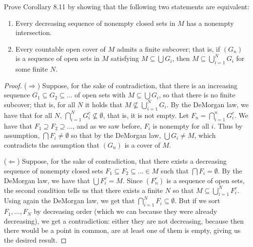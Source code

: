 \begin{exercise}{32}
Prove Corollary 8.11 by showing that the following two statements are equivalent:
\begin{enumerate}
    \item Every decreasing sequence of nonempty closed sets in $M$ has a nonempty intersection.
    \item Every countable open cover of $M$ admits a finite subcover;
    that is, if $(G_n)$ is a sequence of open sets in $M$ satisfying $M \subseteq \bigcup G_i$, then $M\subseteq \bigcup_{i=1}^N G_i$ for some finite $N$.
\end{enumerate}
\end{exercise}
\begin{proof}
($\Rightarrow$)
Suppose, for the sake of contradiction, that there is an increasing sequence $G_1 \subseteq G_2 \subseteq \dots$ of open sets with $M\subseteq\bigcup G_i$, so that there is no finite subcover;
that is, for all $N$ it holds that $M\not\subseteq \bigcup_{i=1}^N G_i$.
By the DeMorgan law, we have that for all $N$, $\bigcap_{i=1}^N G_i^c \not\subseteq \emptyset$, that is, it is not empty.
Let $F_n = \bigcap_{i=1}^n G_i^c$.
We have that $F_1 \supseteq F_2 \supseteq \dots$, and as we saw before, $F_i$ is nonempty for all $i$.
Thus by assumption, $\bigcap F_i \neq \emptyset$ so that by the DeMorgan law, $\bigcup G_i \neq M$, which contradicts the assumption that $(G_n)$ is a cover of $M$.

($\Leftarrow$)
Suppose, for the sake of contradiction, that there exists a decreasing sequence of nonempty closed sets $F_1\subseteq F_2\subseteq \dots \in M$ such that $\bigcap F_i = \emptyset$.
By the DeMorgan law, we have that $\bigcup F_i^c = M$.
Since $(F_n^c)$ is a sequence of open sets, the second condition tells us that there exists a finite $N$ so that $M \subseteq \bigcup_{i=1}^N F^c_i$.
Using again the DeMorgan law, we get that $\bigcap_{i=1}^N F_i \subseteq \emptyset$.
But if we sort $F_1,\dots,F_N$ by decreasing order (which we can because they were already decreasing), we get a contradiction: either they are not decreasing, because then there would be a point in common, are at least one of them is empty, giving us the desired result.
\end{proof} 

